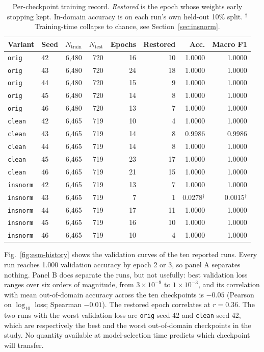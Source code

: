 \documentclass[pdflatex,sn-mathphys-num]{sn-jnl}
\begin{document}
\begin{table}[t]
\caption{Per-checkpoint training record. \emph{Restored} is the epoch whose weights early stopping kept. In-domain accuracy is on each run's own held-out 10\% split. $^\dagger$Training-time collapse to chance, see Section~\ref{sec:insnorm}.}\label{tab:esm-checkpoints}
\setlength{\tabcolsep}{4pt}
\begin{tabular}{@{}llrrrrrr@{}}
\toprule
Variant & Seed & $N_{\text{train}}$ & $N_{\text{test}}$ & Epochs & Restored & Acc. & Macro F1 \\
\midrule
\texttt{orig} & 42 & 6{,}480 & 720 & 16 & 10 & 1.0000 & 1.0000 \\
\texttt{orig} & 43 & 6{,}480 & 720 & 24 & 18 & 1.0000 & 1.0000 \\
\texttt{orig} & 44 & 6{,}480 & 720 & 15 & 9 & 1.0000 & 1.0000 \\
\texttt{orig} & 45 & 6{,}480 & 720 & 14 & 8 & 1.0000 & 1.0000 \\
\texttt{orig} & 46 & 6{,}480 & 720 & 13 & 7 & 1.0000 & 1.0000 \\
\texttt{clean} & 42 & 6{,}465 & 719 & 10 & 4 & 1.0000 & 1.0000 \\
\texttt{clean} & 43 & 6{,}465 & 719 & 14 & 8 & 0.9986 & 0.9986 \\
\texttt{clean} & 44 & 6{,}465 & 719 & 14 & 8 & 1.0000 & 1.0000 \\
\texttt{clean} & 45 & 6{,}465 & 719 & 23 & 17 & 1.0000 & 1.0000 \\
\texttt{clean} & 46 & 6{,}465 & 719 & 21 & 15 & 1.0000 & 1.0000 \\
\texttt{insnorm} & 42 & 6{,}465 & 719 & 13 & 7 & 1.0000 & 1.0000 \\
\texttt{insnorm} & 43 & 6{,}465 & 719 & 7 & 1 & 0.0278$^\dagger$ & 0.0015$^\dagger$ \\
\texttt{insnorm} & 44 & 6{,}465 & 719 & 17 & 11 & 1.0000 & 1.0000 \\
\texttt{insnorm} & 45 & 6{,}465 & 719 & 16 & 10 & 1.0000 & 1.0000 \\
\texttt{insnorm} & 46 & 6{,}465 & 719 & 10 & 4 & 1.0000 & 1.0000 \\
\bottomrule
\end{tabular}
\end{table}

Fig.~\ref{fig:esm-history} shows the validation curves of the ten reported runs. Every run reaches 1.000 validation accuracy by epoch 2 or 3, so panel A separates nothing. Panel B does separate the runs, but not usefully: best validation loss ranges over six orders of magnitude, from $3\times10^{-9}$ to $1\times10^{-3}$, and its correlation with mean out-of-domain accuracy across the ten checkpoints is $-0.05$ (Pearson on $\log_{10}$ loss; Spearman $-0.01$). The restored epoch correlates at $r=0.36$. The two runs with the worst validation loss are \texttt{orig} seed 42 and \texttt{clean} seed 42, which are respectively the best and the worst out-of-domain checkpoints in the study. No quantity available at model-selection time predicts which checkpoint will transfer.
\end{document}
